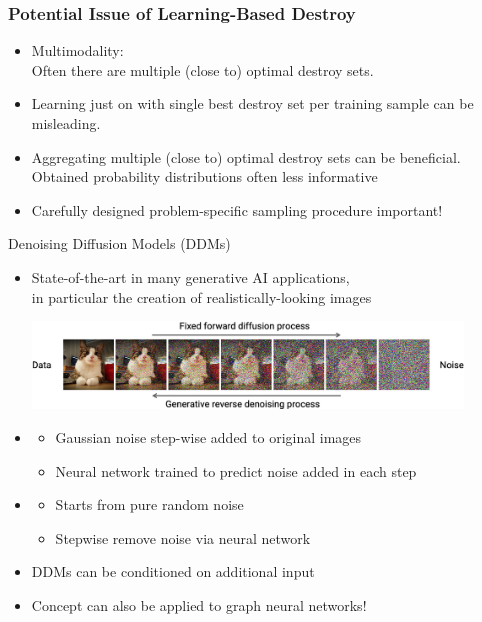\documentclass[aspectratio=1610]{beamer}
\newcommand{\important}[1]{{\color{green!60!black}#1}}
\begin{document}
\begin{frame}
	\frametitle{Potential Issue of Learning-Based Destroy}

	\begin{itemize}
		\itemsep3ex
		\item \alert{Multimodality:}\\
		Often there are multiple (close to) optimal destroy sets.

		\item Learning just on with \important{single best destroy set per training sample can be misleading}.
		
		\item<2> \important{Aggregating multiple (close to) optimal destroy sets} can be beneficial.\\
		 Obtained probability distributions often less informative
		
		\item<2> \important{Carefully designed problem-specific sampling procedure important!}
	\end{itemize}

\end{frame}




\begin{frame}{Denoising Diffusion Models (DDMs)}
\begin{itemize}
	\item State-of-the-art in many generative AI applications,\\
	in particular the creation of realistically-looking images

	\medskip
	\includegraphics[width=0.9\textwidth]{graphics/diffusion.png}

	\bigskip
	\item {}
	\begin{itemize}
		\item Gaussian noise step-wise added to original images
		\item Neural network trained to predict noise added in each step
	\end{itemize}
	\item {}
	\begin{itemize}
		\item Starts from pure random noise
		\item Stepwise remove noise via neural network
	\end{itemize}
	\item DDMs can be conditioned on additional input
	\item \important{Concept can also be applied to graph neural networks!}
\end{itemize}
\end{frame}
\end{document}
